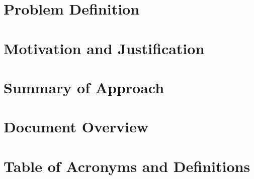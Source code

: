 
\newcommand*{\intro}{chapters/introduction/}

\section{Problem Definition}
	
\section{Motivation and Justification}
	
\section{Summary of Approach}
	
\section{Document Overview}
	
\section[Acronyms]{Table of Acronyms and Definitions}
	
